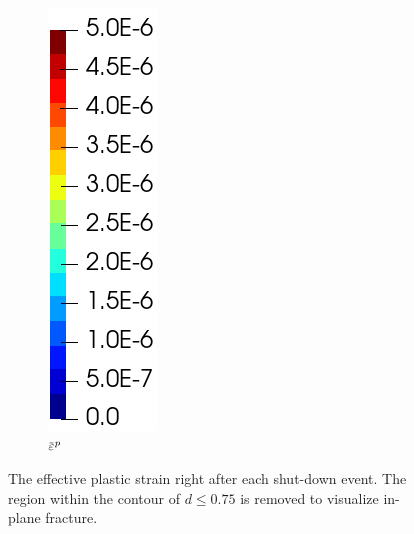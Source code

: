 \begin{figure}[!htb]
\begin{subfigure}{0.08\textwidth}
  \end{subfigure}
  \begin{subfigure}{0.1\textwidth}
    \centering
    \caption*{$\ep$}
    \includegraphics[width=\textwidth]{Chapter5/figures/spallation/colorbar_ep}
  \end{subfigure}
  \caption{The effective plastic strain right after each shut-down event. The region within the contour of $d \leqslant 0.75$ is removed to visualize in-plane fracture.}
  \label{fig: Chapter5/spallation/animation_ep}
\end{figure}
